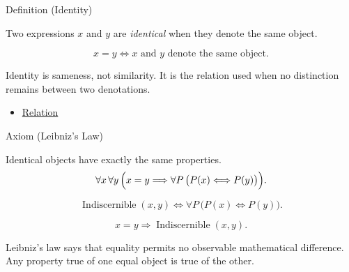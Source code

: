 \begin{definitionbox}{Definition (Identity)}
\begin{definition}[Identity]
\label{def:identity-relation}
Two expressions $x$ and $y$ are \emph{identical} when they denote the same
object.
\end{definition}
\end{definitionbox}

\begin{remark*}
\[
x=y \Longleftrightarrow x \text{ and } y \text{ denote the same object}.
\]
\end{remark*}

\begin{remark*}[Interpretation]
Identity is sameness, not similarity. It is the relation used when no
distinction remains between two denotations.
\end{remark*}

\begin{dependencies}
\begin{itemize}
  \item \hyperref[def:relation]{Relation}
\end{itemize}
\end{dependencies}

\begin{axiombox}{Axiom (Leibniz's Law)}
\begin{axiom}
\label{ax:leibniz-law}
Identical objects have exactly the same properties.
\[
\forall x\,\forall y\,
\Bigl(x=y \Longrightarrow \forall P\,\bigl(P(x)\Longleftrightarrow P(y)\bigr)\Bigr).
\]
\end{axiom}
\end{axiombox}

\begin{remark*}
\[
\operatorname{Indiscernible}(x,y)
\Longleftrightarrow
\forall P\,\bigl(P(x)\Longleftrightarrow P(y)\bigr).
\]
\end{remark*}

\begin{remark*}
\[
x=y \Longrightarrow \operatorname{Indiscernible}(x,y).
\]
\end{remark*}

\begin{remark*}[Interpretation]
Leibniz's law says that equality permits no observable mathematical
difference. Any property true of one equal object is true of the other.
\end{remark*}

